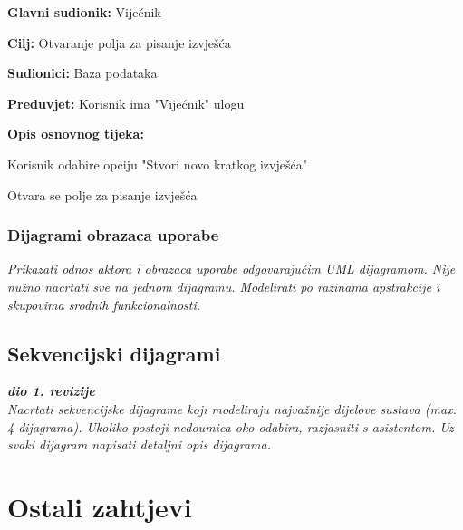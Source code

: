					\begin{packed_item}
	
						\item \textbf{Glavni sudionik: }Vijećnik
						\item  \textbf{Cilj:} Otvaranje polja za pisanje izvješća
						\item  \textbf{Sudionici:} Baza podataka
						\item  \textbf{Preduvjet:} Korisnik ima "Vijećnik" ulogu
						\item  \textbf{Opis osnovnog tijeka:}
						
						\item[] \begin{packed_enum}
	
							\item Korisnik odabire opciju "Stvori novo kratkog izvješća" 
							\item Otvara se polje za pisanje izvješća
							
							
						\end{packed_enum}
						
						
					\end{packed_item}					
					
				\subsubsection{Dijagrami obrazaca uporabe}
					
					\textit{Prikazati odnos aktora i obrazaca uporabe odgovarajućim UML dijagramom. Nije nužno nacrtati sve na jednom dijagramu. Modelirati po razinama apstrakcije i skupovima srodnih funkcionalnosti.}
				\eject		
				
			\subsection{Sekvencijski dijagrami}
				
				\textbf{\textit{dio 1. revizije}}\\
				
				\textit{Nacrtati sekvencijske dijagrame koji modeliraju najvažnije dijelove sustava (max. 4 dijagrama). Ukoliko postoji nedoumica oko odabira, razjasniti s asistentom. Uz svaki dijagram napisati detaljni opis dijagrama.}
				\eject
	
		\section{Ostali zahtjevi}
		
